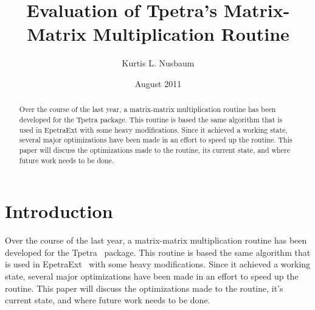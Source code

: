 \documentclass{article}
\title{Evaluation of Tpetra's Matrix-Matrix Multiplication Routine}
\author{Kurtis L. Nusbaum}
\date{August 2011}
\begin{document}
\maketitle

\begin{abstract}
Over the course of the last year, a matrix-matrix multiplication routine has been developed for the Tpetra package.
This routine is based the same algorithm that is used in EpetraExt with some heavy modifications. Since it 
achieved a working state, several major optimizations have been made in an effort to speed up the routine. This paper will
discuss the optimizations made to the routine, its current state, and where future work needs to be done.
\end{abstract}
\clearpage
\tableofcontents
\clearpage

\section{Introduction}
Over the course of the last year, a matrix-matrix multiplication routine has been developed for the 
Tpetra~\cite{TpetraHomePage}
package. This routine is based the same algorithm that is used in EpetraExt~\cite{EpetraExtHomePage} 
with some heavy modifications. Since it achieved a working state, several major optimizations have been made in an 
effort to speed up the routine. This paper will
discuss the optimizations made to the routine, it's current state, and where future work needs to be done.
\end{document}
